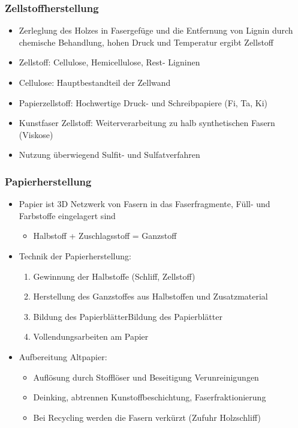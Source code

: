 \documentclass[12pt]{article}
\begin{document}
\subsubsection{Zellstoffherstellung}
\begin{itemize}
  \item Zerleglung des Holzes in Fasergefüge und die Entfernung von Lignin
  durch chemische Behandlung, hohen Druck und Temperatur ergibt Zellstoff
  \item Zellstoff: Cellulose, Hemicellulose, Rest- Ligninen
  \item Cellulose: Hauptbestandteil der Zellwand
  \item Papierzellstoff: Hochwertige Druck- und Schreibpapiere (Fi, Ta, Ki)
  \item Kunstfaser Zellstoff: Weiterverarbeitung zu halb synthetischen Fasern
  (Viskose)
  \item Nutzung überwiegend Sulfit- und Sulfatverfahren
\end{itemize}

\subsubsection{Papierherstellung}
\begin{itemize}
  \item Papier ist 3D Netzwerk von Fasern in das Faserfragmente, Füll- und
  Farbstoffe eingelagert sind
  \begin{itemize}
    \item Halbstoff  + Zuschlagsstoff = Ganzstoff
  \end{itemize}
  \item Technik der Papierherstellung:
  \begin{enumerate}
    \item Gewinnung der Halbstoffe (Schliff, Zellstoff) 
    \item Herstellung des Ganzstoffes aus Halbstoffen und Zusatzmaterial
    \item Bildung des PapierblätterBildung des Papierblätter
    \item Vollendungsarbeiten am Papier
  \end{enumerate}
  \item Aufbereitung Altpapier:
  \begin{itemize}
    \item Auflösung durch Stofflöser und Beseitigung Verunreinigungen
    \item Deinking, abtrennen Kunstoffbeschichtung, Faserfraktionierung
    \item Bei Recycling werden die Fasern verkürzt (Zufuhr Holzschliff)
  \end{itemize} 
\end{itemize}
\end{document}
